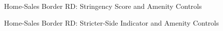 \begin{table}[H]
    \caption{Home-Sales Border RD: Stringency Score and Amenity Controls}
    \label{tab:sales_rd_amenity_strictness}

    
\end{table}

\begin{table}[H]
    \caption{Home-Sales Border RD: Stricter-Side Indicator and Amenity Controls}
    \label{tab:sales_rd_amenity_binary}

    
\end{table}
